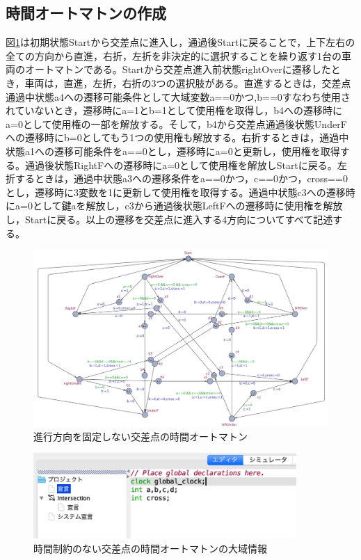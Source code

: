 \documentclass{tpu-sotu}
\begin{document}
	\subsection{時間オートマトンの作成}	
	図\ref{IB}は初期状態Startから交差点に進入し，通過後Startに戻ることで，上下左右の全ての方向から直進，右折，左折を非決定的に選択することを繰り返す1台の車両のオートマトンである。Startから交差点進入前状態rightOverに遷移したとき，車両は，直進，左折，右折の3つの選択肢がある。直進するときは，交差点通過中状態a4への遷移可能条件として大域変数a==0かつ,b==0すなわち使用されていないとき，遷移時にa=1とb=1として使用権を取得し，b4への遷移時にa=0として使用権の一部を解放する。そして，b4から交差点通過後状態UnderFへの遷移時にb=0としてもう1つの使用権も解放する。右折するときは，通過中状態a1への遷移可能条件をa==0とし，遷移時にa=0と更新し，使用権を取得する。通過後状態RightFへの遷移時にa=0として使用権を解放しStartに戻る。左折するときは，通過中状態a3への遷移条件をa==0かつ，c==0かつ，cross==0とし，遷移時に3変数を1に更新して使用権を取得する。通過中状態c3への遷移時にa=0として鍵aを解放し，c3から通過後状態LeftFへの遷移時に使用権を解放し，Startに戻る。以上の遷移を交差点に進入する4方向についてすべて記述する。
	\begin{figure}[htbp]
	\centering
	\includegraphics[width=150mm]{IntersectionBig.png}
	\caption{進行方向を固定しない交差点の時間オートマトン}
	\label{IB}
	\end{figure}
	\begin{figure}[htbp]
	\centering
	\includegraphics[width=100mm]{IBSimuGD.png}
	\caption{時間制約のない交差点の時間オートマトンの大域情報}
	\label{IBSi}
	\end{figure}
\end{document}
